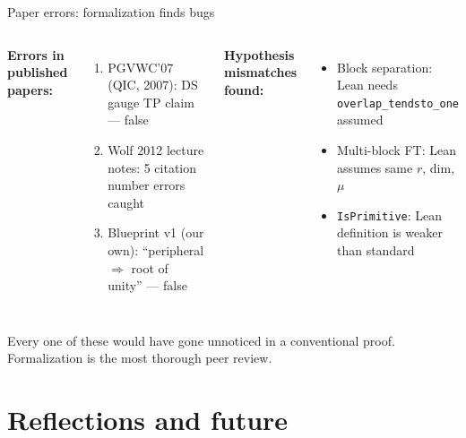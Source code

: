 \documentclass[aspectratio=169,10pt]{beamer}
\begin{document}
\begin{frame}{Paper errors: formalization finds bugs}
    \begin{columns}[T]
        \textcolor{leangreen}{\textbf{Errors in published papers:}}
        \begin{enumerate}
            \item PGVWC'07 (QIC, 2007): DS gauge TP claim --- \textcolor{softred}{false}
            \item Wolf 2012 lecture notes: 5 citation number errors caught
            \item Blueprint v1 (our own): ``peripheral $\Rightarrow$ root of unity'' --- \textcolor{softred}{false}
        \end{enumerate}
        \textcolor{leangreen}{\textbf{Hypothesis mismatches found:}}
        \begin{itemize}
            \item Block separation: Lean needs \texttt{overlap\_tendsto\_one} assumed
            \item Multi-block FT: Lean assumes same $r$, dim, $\mu$
            \item \texttt{IsPrimitive}: Lean definition is weaker than standard
        \end{itemize}
    \end{columns}
    \vspace{0.3em}
    \textcolor{dimwhite}{\footnotesize Every one of these would have gone unnoticed in a conventional proof. Formalization is the most thorough peer review.}
\end{frame}

\section{Reflections and future}
\end{document}
